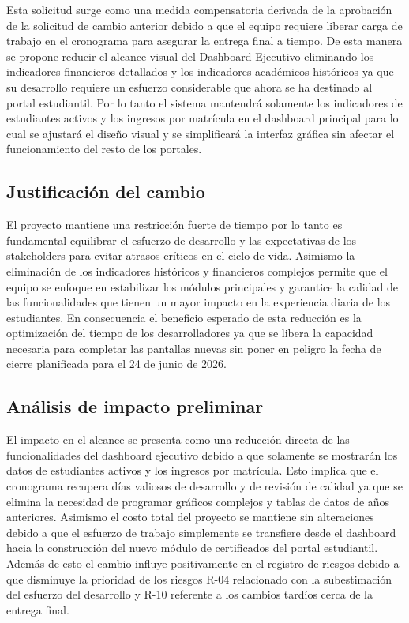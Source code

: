 \documentclass[11pt,spanish]{article}
\begin{document}
Esta solicitud surge como una medida compensatoria derivada de la aprobación de la solicitud de cambio anterior debido a que el equipo requiere liberar carga de trabajo en el cronograma para asegurar la entrega final a tiempo. De esta manera se propone reducir el alcance visual del Dashboard Ejecutivo eliminando los indicadores financieros detallados y los indicadores académicos históricos ya que su desarrollo requiere un esfuerzo considerable que ahora se ha destinado al portal estudiantil. Por lo tanto el sistema mantendrá solamente los indicadores de estudiantes activos y los ingresos por matrícula en el dashboard principal para lo cual se ajustará el diseño visual y se simplificará la interfaz gráfica sin afectar el funcionamiento del resto de los portales.

\subsection{Justificación del cambio}

El proyecto mantiene una restricción fuerte de tiempo por lo tanto es fundamental equilibrar el esfuerzo de desarrollo y las expectativas de los stakeholders para evitar atrasos críticos en el ciclo de vida. Asimismo la eliminación de los indicadores históricos y financieros complejos permite que el equipo se enfoque en estabilizar los módulos principales y garantice la calidad de las funcionalidades que tienen un mayor impacto en la experiencia diaria de los estudiantes. En consecuencia el beneficio esperado de esta reducción es la optimización del tiempo de los desarrolladores ya que se libera la capacidad necesaria para completar las pantallas nuevas sin poner en peligro la fecha de cierre planificada para el 24 de junio de 2026.

\subsection{Análisis de impacto preliminar}

El impacto en el alcance se presenta como una reducción directa de las funcionalidades del dashboard ejecutivo debido a que solamente se mostrarán los datos de estudiantes activos y los ingresos por matrícula. Esto implica que el cronograma recupera días valiosos de desarrollo y de revisión de calidad ya que se elimina la necesidad de programar gráficos complejos y tablas de datos de años anteriores. Asimismo el costo total del proyecto se mantiene sin alteraciones debido a que el esfuerzo de trabajo simplemente se transfiere desde el dashboard hacia la construcción del nuevo módulo de certificados del portal estudiantil. Además de esto el cambio influye positivamente en el registro de riesgos debido a que disminuye la prioridad de los riesgos R-04 relacionado con la subestimación del esfuerzo del desarrollo y R-10 referente a los cambios tardíos cerca de la entrega final.
\end{document}
